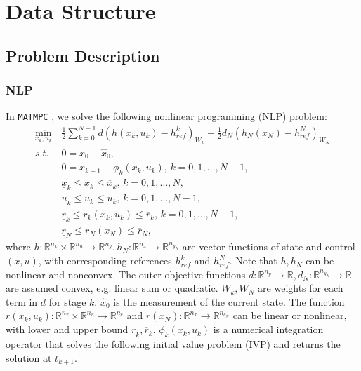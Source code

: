 \documentclass{article}
\newcommand{\software}[1]{{\tt#1}}
\begin{document}
\section{Data Structure}

\subsection{Problem Description}

\subsubsection{NLP}
In \software{MATMPC} \cite{chen2019matmpc}, we solve the following nonlinear programming (NLP) problem:
\begin{equation}\label{NLP}
	\begin{aligned}
	\min_{x_k,u_k} \,&\frac{1}{2}\sum_{k=0}^{N-1} d(h(x_k,u_k)-h_{ref}^k)_{W_k}+\frac{1}{2}d_N(h_N(x_N)-h_{ref}^N)_{W_N}\\
	s.t.\, &0=x_0-\hat{x}_0,\\
	&0=x_{k+1}-\phi_k(x_k,u_k),\, k=0,1,\ldots,N-1,\\
	&\underline{x}_k\leq x_k\leq \overline{x}_k,\,k=0,1,\ldots,N,\\
	&\underline{u}_k\leq u_k\leq \overline{u}_k,\,k=0,1,\ldots,N-1,\\
	&\underline{r}_k\leq r_k(x_k,u_k)\leq \overline{r}_k, \,k=0,1,\ldots,N-1,\\
	&\underline{r}_N\leq r_N(x_N)\leq \overline{r}_N,
	\end{aligned}
\end{equation}
where $h:\mathbb{R}^{n_x}\times\mathbb{R}^{n_u}\rightarrow \mathbb{R}^{n_y},h_N:\mathbb{R}^{n_x}\rightarrow\mathbb{R}^{n_{y_N}}$ are vector functions of state and control $(x,u)$, with corresponding references $h_{ref}^k$ and $h_{ref}^N$. Note that $h,h_N$ can be nonlinear and nonconvex. The outer objective functions $d:\mathbb{R}^{n_y}\rightarrow \mathbb{R}, d_N:\mathbb{R}^{n_{y_N}}\rightarrow \mathbb{R}$ are assumed convex, e.g. linear sum or quadratic. $W_k,W_N$ are weights for each term in $d$ for stage $k$. $\hat{x}_0$ is the measurement of the current state. The function $r(x_k,u_k): \mathbb{R}^{n_x}\times\mathbb{R}^{n_u} \rightarrow \mathbb{R}^{n_c}$ and $r(x_N): \mathbb{R}^{n_x}\rightarrow \mathbb{R}^{n_{c_N}}$ can be linear or nonlinear, with lower and upper bound $\underline{r}_k, \overline{r}_k$. $\phi_k(x_k,u_k)$ is a numerical integration operator that solves the following initial value problem (IVP) and returns the solution at $t_{k+1}$.
\end{document}
